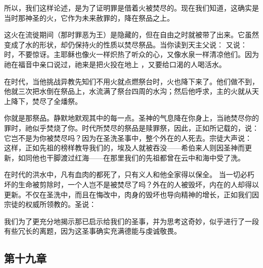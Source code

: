 所以，我们这样论述，是为了证明罪是借着火被焚尽的。现在我们知道，这确实是当时那神圣的火，它作为未来赦罪的，降在祭品之上。\par

这火在流徙期间（那时罪恶为王）是隐藏的，但在自由之时就被带了出来。它虽然变成了水的形状，却仍保持火的性质以焚尽祭品。当你读到天主父说：  又说：  时，不要惊讶。主耶稣也像火一样炽热了听众的心，又像水泉一样清凉他们。因为祂在福音中亲口说过，祂来是把火投在地上 ，又要给口渴的人喝活水。 \par

在时代，当他挑战异教先知们不用火就点燃祭台时，火也降下来了。他们做不到，他就三次把水倒在祭品上，水流满了祭台四周的水沟；然后他呼求，主的火就从天上降下，焚尽了全燔祭。\par

你就是那祭品。静默地默观其中的每一点。圣神的气息降在你身上，当祂焚尽你的罪时，祂似乎焚烧了你。时代所焚尽的祭品是赎罪祭，因此，正如所记载的，说：  它岂不是为你被焚尽吗？因为在圣洗圣事中，整个外在的人死去。宗徒大声说：  这样，正如先祖的榜样教导我们的，埃及人就被吞没——希伯来人则因圣神而更新，如同他也干脚渡过红海——在那里我们的先祖都曾在云中和海中受了洗。 \par

在时代的洪水中，凡有血肉的都死了，只有义人和他全家得以保全。 当一切必朽坏的生命被剪除时，一个人岂不是被焚尽了吗？外在的人被毁坏，内在的人却得以更新。不仅在圣洗中，而且在悔改中，肉身的毁坏也导向精神的增长，正如我们因宗徒的权威所领教的。圣说：\par

我们为了更充分地揭示那已启示给我们的圣事，并为思考这奇妙，似乎进行了一段有些冗长的离题，因为这圣事确实充满德能与虔诚敬畏。\par


\subsection{第十九章}

